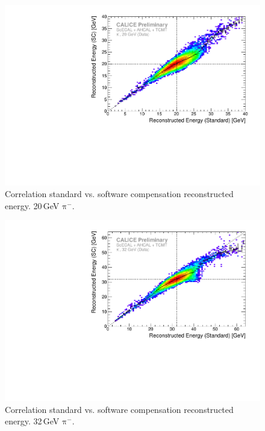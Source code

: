 \documentclass[twoside,a4paper,12pt]{article}
\newcommand\piminus{\(\mathrm{\pi^-}\)}
\begin{document}
\begin{figure}[htbp]
\begin{center}
\includegraphics[width=1\textwidth,page=1]{ERec_corr_560481_data}
\caption{Correlation standard vs. software compensation reconstructed energy. 20\,GeV \piminus.}
\label{fig:erec_20gev}
\end{center}
\end{figure}

\begin{figure}[htbp]
\begin{center}
\includegraphics[width=1\textwidth,page=1]{ERec_corr_560474_data}
\caption{Correlation standard vs. software compensation reconstructed energy. 32\,GeV \piminus.}
\label{fig:erec_32gev}
\end{center}
\end{figure}
\end{document}
